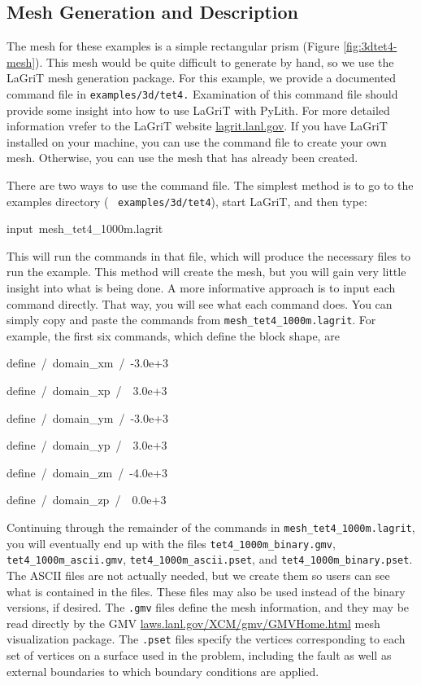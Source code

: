 \subsection{Mesh Generation and Description}

The mesh for these examples is a simple rectangular prism (Figure
\vref{fig:3dtet4-mesh}). This mesh would be quite difficult to generate
by hand, so we use the LaGriT mesh generation package. For this example,
we provide a documented command file in \texttt{examples/3d/tet4.}
Examination of this command file should provide some insight into
how to use LaGriT with PyLith. For more detailed information vrefer
to the LaGriT website \url{lagrit.lanl.gov}. If you have LaGriT installed
on your machine, you can use the command file to create your own mesh.
Otherwise, you can use the mesh that has already been created.

There are two ways to use the command file. The simplest method is
to go to the\textsf{ }examples directory (\texttt{}~\linebreak{}
\texttt{examples/3d/tet4}), start LaGriT, and then type:
\begin{lyxcode}
input~mesh\_tet4\_1000m.lagrit
\end{lyxcode}
This will run the commands in that file, which will produce the necessary
files to run the example. This method will create the mesh, but you
will gain very little insight into what is being done. A more informative
approach is to input each command directly. That way, you will see
what each command does. You can simply copy and paste the commands
from \texttt{mesh\_tet4\_1000m.lagrit}. For example, the first six
commands, which define the block shape, are
\begin{lyxcode}
define~/~domain\_xm~/~-3.0e+3

define~/~domain\_xp~/~~3.0e+3

define~/~domain\_ym~/~-3.0e+3

define~/~domain\_yp~/~~3.0e+3

define~/~domain\_zm~/~-4.0e+3

define~/~domain\_zp~/~~0.0e+3~
\end{lyxcode}
Continuing through the remainder of the commands in \texttt{mesh\_tet4\_1000m.lagrit},
you will eventually end up with the files \texttt{tet4\_1000m\_binary.gmv},
\texttt{tet4\_1000m\_ascii.gmv}, \texttt{tet4\_1000m\_ascii.pset},
and \texttt{tet4\_1000m\_binary.pset}. The ASCII files are not actually
needed, but we create them so users can see what is contained in the
files. These files may also be used instead of the binary versions,
if desired. The \texttt{.gmv} files define the mesh information, and
they may be read directly by the GMV \url{laws.lanl.gov/XCM/gmv/GMVHome.html}
mesh visualization package. The \texttt{.pset} files specify the vertices
corresponding to each set of vertices on a surface used in the problem,
including the fault as well as external boundaries to which boundary
conditions are applied.

